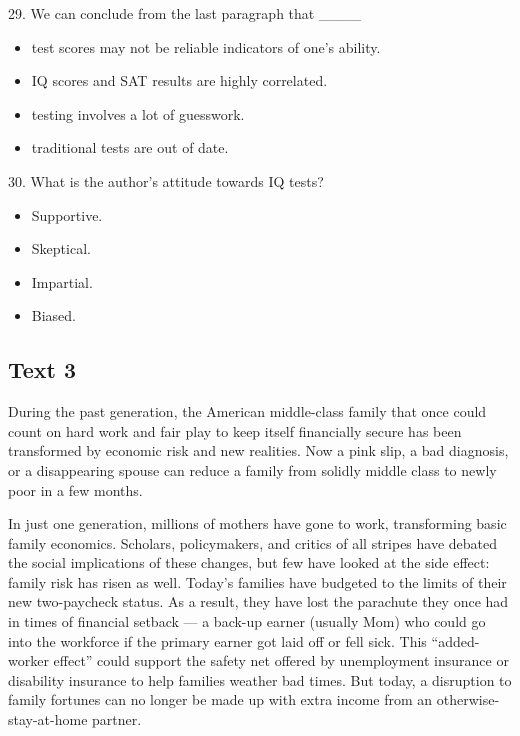 \documentclass[UTF8,11pt]{ctexart}
\begin{document}
29. We can conclude from the last paragraph that \_\_\_\_


\begin{itemize}[leftmargin=2em,itemsep=.2em,topsep=.4em]\item[A.] test scores may not be reliable indicators of one’s ability.
\item[B.] IQ scores and SAT results are highly correlated.
\item[C.] testing involves a lot of guesswork.
\item[D.] traditional tests are out of date.
\end{itemize}

30. What is the author’s attitude towards IQ tests?


\begin{itemize}[leftmargin=2em,itemsep=.2em,topsep=.4em]\item[A.] Supportive.
\item[B.] Skeptical.
\item[C.] Impartial.
\item[D.] Biased.
\end{itemize}

\subsection*{\textbf{Text 3}}


During the past generation, the American middle-class family that once could count on hard work and fair play to keep itself financially secure has been transformed by economic risk and new realities. Now a pink slip, a bad diagnosis, or a disappearing spouse can reduce a family from solidly middle class to newly poor in a few months.


In just one generation, millions of mothers have gone to work, transforming basic family economics. Scholars, policymakers, and critics of all stripes have debated the social implications of these changes, but few have looked at the side effect: family risk has risen as well. Today’s families have budgeted to the limits of their new two-paycheck status. As a result, they have lost the parachute they once had in times of financial setback — a back-up earner (usually Mom) who could go into the workforce if the primary earner got laid off or fell sick. This “added-worker effect” could support the safety net offered by unemployment insurance or disability insurance to help families weather bad times. But today, a disruption to family fortunes can no longer be made up with extra income from an otherwise-stay-at-home partner.
\end{document}
